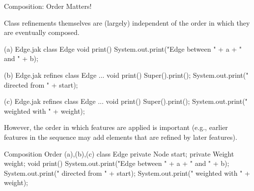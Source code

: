 \begin{frame}[fragile]{Composition: Order Matters!}
	\begin{note}{}
		Class refinements themselves are (largely) independent of the order in which they are eventually composed.
	\end{note}
	\pause
	\begin{mycolumns}[widths={50,50},animation=none]
{
\begin{codetight}[basicstyle=\tiny]{(a) Edge.jak}
class Edge {
	void print() {
		System.out.print("Edge between " + a + " and " + b);
	}
}
\end{codetight}
\begin{codetight}[basicstyle=\tiny]{(b) Edge.jak}
refines class Edge { ...
	void print() {
		Super().print();
		System.out.print(" directed from " + start);
	}
}
\end{codetight}
\begin{codetight}[basicstyle=\tiny]{(c) Edge.jak}
refines class Edge { ...
	void print() {
		Super().print();
		System.out.print(" weighted with " + weight);
	}
}
\end{codetight}
}
	\mynextcolumn
		\pause
		\begin{note}{}
			However, the order in which features are applied is important 
			(e.g., earlier features in the sequence may add elements that are refined by later features). 
		\end{note}
\begin{codetight}{Composition Order (a),(b),(c)}
class Edge {
	private Node start;
	private Weight weight;
	void print() {
		System.out.print("Edge between " + a + " and " + b);
		System.out.print(" directed from " + start);
		System.out.print(" weighted with " + weight);
	}
}
\end{codetight}
	\end{mycolumns}
\end{frame}

